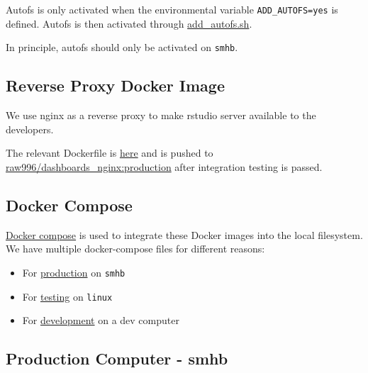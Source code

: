 \documentclass[12pt,]{article}
\providecommand{\tightlist}{%
  \setlength{\itemsep}{0pt}\setlength{\parskip}{0pt}}
\begin{document}
Autofs is only activated when the environmental variable
\texttt{ADD\_AUTOFS=yes} is defined. Autofs is then activated through
\href{https://github.com/raubreywhite/dashboards_control/blob/master/infrastructure/dashboards_r/add_autofs.sh}{add\_autofs.sh}.

In principle, autofs should only be activated on \texttt{smhb}.

\subsection{Reverse Proxy Docker
Image}\label{reverse-proxy-docker-image}

We use nginx as a reverse proxy to make rstudio server available to the
developers.

The relevant Dockerfile is
\href{https://github.com/raubreywhite/dashboards_control/blob/master/infrastructure/dashboards_nginx/Dockerfile}{here}
and is pushed to
\href{https://hub.docker.com/r/raw996/dashboards_nginx/}{raw996/dashboards\_nginx:production}
after integration testing is passed.

\hypertarget{dockercompose}{\subsection{Docker
Compose}\label{dockercompose}}

\href{https://docs.docker.com/compose/}{Docker compose} is used to
integrate these Docker images into the local filesystem. We have
multiple docker-compose files for different reasons:

\begin{itemize}
\tightlist
\item
  For
  \href{https://github.com/raubreywhite/dashboards_control/blob/master/infrastructure/docker-compose-prod.yml}{production}
  on \texttt{smhb}
\item
  For
  \href{https://github.com/raubreywhite/dashboards_control/blob/master/infrastructure/docker-compose-test.yml}{testing}
  on \texttt{linux}
\item
  For
  \href{https://github.com/raubreywhite/dashboards_control/blob/master/infrastructure/docker-compose-dev.yml}{development}
  on a dev computer
\end{itemize}

\subsection{Production Computer -
smhb}\label{production-computer---smhb}
\end{document}
